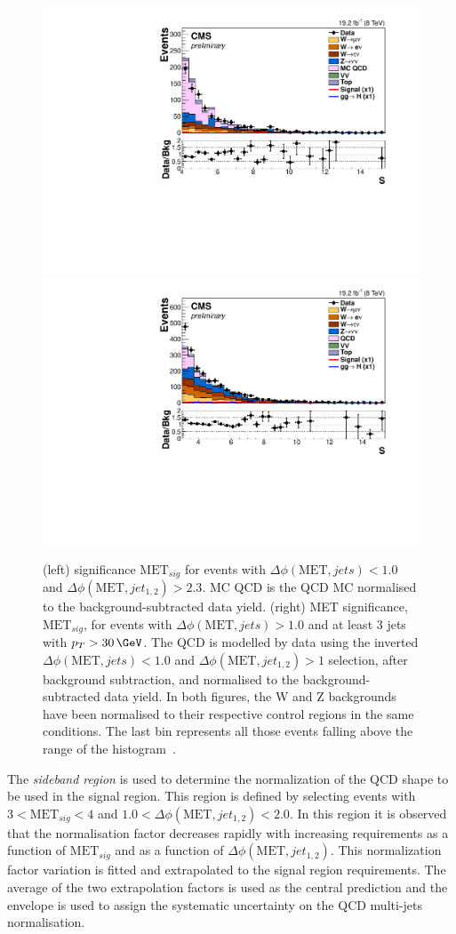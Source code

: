 \begin{figure}[!htb]
\centering
\includegraphics[width=.45\textwidth]{Chapter07/Images/output_invqcd_qcd_metnomu_significance.pdf}
\includegraphics[width=.45\textwidth]{Chapter07/Images/output_invqcd_3j_nunu_metnomu_significance.pdf}
\caption[\MET significance $\text{MET}_{sig}$ for events with $\Delta\phi(\text{MET},jets)<1.0$ and $\Delta\phi(\text{MET},jet_{1,2})>2.3$. \gls{MET} significance, $\text{MET}_{sig}$, for events with $\Delta\phi(\text{MET},jets)>1.0$ and at least 3 jets with $p_T>30\,\GeV$.]
{(left) \MET significance $\text{MET}_{sig}$ for events with $\Delta\phi(\text{MET},jets)<1.0$ and $\Delta\phi(\text{MET},jet_{1,2})>2.3$. MC QCD is the \gls{QCD} \gls{MC} normalised to the background-subtracted data yield. (right) \gls{MET} significance, $\text{MET}_{sig}$, for events with $\Delta\phi(\text{MET},jets)>1.0$ and at least 3 jets with $p_T>30\,\GeV$. The \gls{QCD} is modelled by data using the inverted $\Delta\phi(\text{MET},jets)<1.0$ and $\Delta\phi(\text{MET},jet_{1,2})>1$ selection, after background subtraction, and normalised to the background-subtracted data yield. In both figures, the W and Z backgrounds have been normalised to their respective control regions in the same conditions. The last bin represents all those events falling above the range of the histogram~\cite{ARTICLE:CMSVBFHiggsInvisibleParkedAnalysisPAS}.}
\label{FIGURE:ParkedDataAnalysis_QCDBackground_Plots}
\end{figure}

The \textit{sideband region} is used to determine the normalization of the \gls{QCD} shape to be used in the signal region. This region is defined by selecting events with $3<\text{MET}_{sig}<4$ and $1.0<\Delta\phi(\text{MET},jet_{1,2})<2.0$. In this region it is observed that the normalisation factor decreases rapidly with increasing requirements as a function of $\text{MET}_{sig}$ and as a function of $\Delta\phi(\text{MET},jet_{1,2})$. This normalization factor variation is fitted and extrapolated to the signal region requirements. The average of the two extrapolation factors is used as the central prediction and the envelope is used to assign the systematic uncertainty on the \gls{QCD} multi-jets normalisation.


